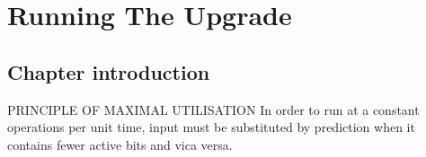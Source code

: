 \chapter{Running The Upgrade}
\section{Chapter introduction}
PRINCIPLE OF MAXIMAL UTILISATION
	In order to run at a constant operations per unit time, input must be substituted by prediction when it contains fewer active bits and vica versa.

